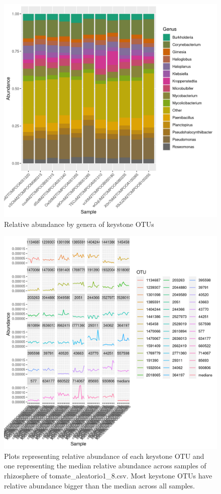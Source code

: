\begin{figure}
\centering
\includegraphics[scale = 0.8]{tomate_aleatorio1_8.csv_relative_abundance_Genus.png}
\caption{Relative abundance by genera of keystone OTUs }
\label{fig:tomate_aleatorio1_8.csv_genus}
\end{figure}
\begin{figure}
   \centering
   \includegraphics[scale = 0.8]{abundance_tomate_aleatorio1_8.csv_key_otus_medians.png}
   \caption{Plots representing relative abundance of each keystone OTU and one representing the median relative abundance  across samples of rhizosphere of tomate_aleatorio1_8.csv. Most keystone OTUs have relative abundance bigger than the median across all samples.  }
   \label{key_otus_vs_medians_tomate_aleatorio1_8.csv}
\end{figure}
